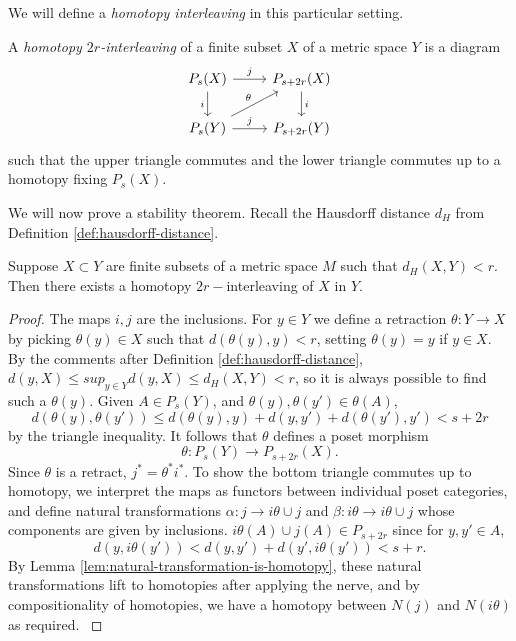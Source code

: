 We will define a \textit{homotopy interleaving} in this particular setting.
\begin{definition}
    A \textit{homotopy $2r$-interleaving} of a finite subset $X$ of a metric space $Y$ is a diagram
\[\begin{tikzcd}
P_s(X) \arrow[r, "j"] \arrow[d, "i"']      & P_{s+2r}(X) \arrow[d, "i"] \\
P_s(Y) \arrow[r, "j"] \arrow[ru, "\theta"] & P_{s+2r}(Y)               
\end{tikzcd}\]
such that the upper triangle commutes and the lower triangle commutes up to a homotopy fixing $P_s(X)$. 
    \cite{Jardine}
    \end{definition}
We will now prove a stability theorem. Recall the Hausdorff distance $d_H$ from Definition \ref{def:hausdorff-distance}.
\begin{theorem}
Suppose $X\subset Y$ are finite subsets of a metric space $M$ such that $d_H(X,Y)<r$. Then there exists a homotopy $2r-$interleaving of $X$ in $Y$.
\end{theorem}
\begin{proof}
The maps $i,j$ are the inclusions. For $y\in Y$ we define a retraction $\theta:Y\rightarrow X$ by picking $\theta(y)\in X$ such that $d(\theta(y),y)<r$, setting $\theta(y)=y$ if $y\in X$. By the comments after Definition \ref{def:hausdorff-distance}, $d(y,X)\leq sup_{y\in Y}d(y,X)\leq d_H(X,Y)<r$, so it is always possible to find such a $\theta(y)$. Given $A\in P_s(Y)$, and $\theta(y),\theta(y')\in \theta(A)$, $$d(\theta(y),\theta(y'))\leq d(\theta(y),y)+d(y,y')+d(\theta(y'),y')<s+2r$$ by the triangle inequality. It follows that $\theta$ defines a poset morphism $$\theta:P_s(Y)\rightarrow P_{s+2r}(X).$$ Since $\theta$ is a retract, $j^*=\theta^*i^*$. To show the bottom triangle commutes up to homotopy, we interpret the maps as functors between individual poset categories, and define natural transformations
$\alpha:j\rightarrow i\theta\cup j$ and $\beta:i\theta\rightarrow i\theta \cup j$ whose components are given by inclusions. $i\theta(A) \cup j(A)\in P_{s+2r}$ since for $y,y'\in A$, $$d(y,i\theta(y'))<d(y,y')+d(y',i\theta(y'))<s+r.$$ By Lemma \ref{lem:natural-transformation-is-homotopy}, these natural transformations lift to homotopies after applying the nerve, and by compositionality of homotopies, we have a homotopy between $N(j)$ and $N(i\theta)$ as required.
\cite{Jardine}
\end{proof}


